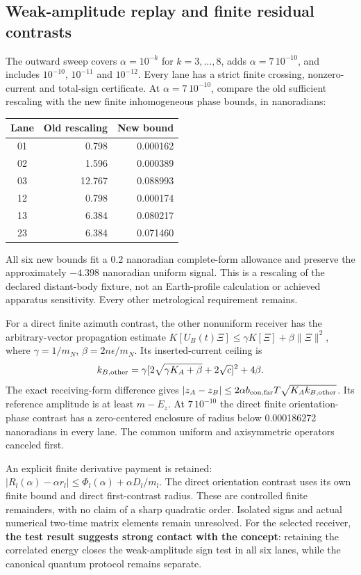 \subsection{Weak-amplitude replay and finite residual contrasts}
The outward sweep covers $\alpha=10^{-k}$ for $k=3,\ldots,8$,
adds $\alpha=7\,10^{-10}$, and includes $10^{-10}$, $10^{-11}$ and
$10^{-12}$. Every lane has a strict finite crossing, nonzero-current and
total-sign certificate. At
$\alpha=7\,10^{-10}$, compare the old sufficient rescaling with the new
finite inhomogeneous phase bounds, in nanoradians:
\begin{center}\small
\begin{tabular}{c rr}\toprule
Lane&Old rescaling&New bound\\\midrule
01&0.798&0.000162\\
02&1.596&0.000389\\
03&12.767&0.088993\\
12&0.798&0.000174\\
13&6.384&0.080217\\
23&6.384&0.071460\\\bottomrule
\end{tabular}
\end{center}
All six new bounds fit a 0.2 nanoradian complete-form allowance and preserve
the approximately $-4.398$ nanoradian uniform signal. This is a rescaling
of the declared distant-body fixture, not an Earth-profile calculation or
achieved apparatus sensitivity. Every other metrological requirement remains.

For a direct finite azimuth contrast, the other nonuniform receiver has
the arbitrary-vector propagation estimate
$K[U_B(t)\Xi]\le\gamma K[\Xi]+\beta\|\Xi\|^2$,
where $\gamma=1/m_N$, $\beta=2n\epsilon/m_N$.
Its inserted-current ceiling is
\[
 k_{B,\rm other}
 =\gamma[2\sqrt{\gamma K_A+\beta}+2\sqrt c]^2+4\beta.
\]
The exact receiving-form difference gives
$|z_A-z_B|\le2\alpha b_{{\rm con},\rm far}T
\sqrt{K_Ak_{B,\rm other}}$. Its reference amplitude is at least $m-E_z$.
At $7\,10^{-10}$ the direct finite orientation-phase contrast has a
zero-centered enclosure of radius below 0.000186272 nanoradians in every
lane. The common uniform and axisymmetric operators canceled first.

An explicit finite derivative payment is retained:
$|R_l(\alpha)-\alpha r_l|\le\Phi_l(\alpha)+\alpha D_l/m_l$.
The direct orientation contrast uses its own finite bound and direct
first-contrast radius. These are controlled finite remainders, with no
claim of a sharp quadratic order. Isolated signs and actual numerical
two-time matrix elements remain unresolved. For the selected receiver,
\textbf{the test result suggests strong contact with the concept}: retaining
the correlated energy closes the weak-amplitude sign test in all six lanes,
while the canonical quantum protocol remains separate.

